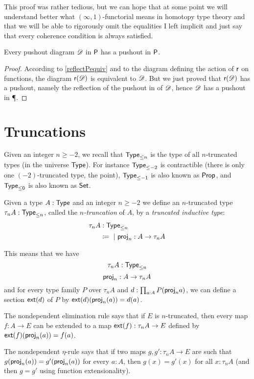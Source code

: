 This proof was rather tedious, but we can hope that at some point we will
understand better what $(\infty,1)$-functorial means in homotopy type theory and
that we will be able to rigorously omit the equalities I left implicit and just
say that every coherence condition is always satisfied.

\begin{cor}
  Every pushout diagram $\Ddiag$ in $\P$ has a pushout in $\P$.
\end{cor}

\begin{proof}
  According to \autoref{reflectPequiv} and to the diagram defining the action of
  $\reflect$ on functions, the diagram $\reflect(\Ddiag)$ is equivalent to
  $\Ddiag$. But we just proved that $\reflect(\Ddiag)$ has a pushout, namely the
  reflection of the pushout in \type of $\Ddiag$, hence $\Ddiag$ has a pushout
  in \P.
\end{proof}

\section{Truncations}

Given an integer $n\ge-2$, we recall that $\typele{n}$ is the type of all
$n$-truncated types (in the universe $\type$). For instance $\typele{-2}$ is
contractible (there is only one $(-2)$-truncated type, the point), $\typele{-1}$
is also known as $\prop$, and $\typele{0}$ is also known as $\set$.

Given a type $A:\type$ and an integer $n\ge-2$ we define an $n$-truncated type
$\tau_nA:\typele{n}$, called the \emph{$n$-truncation} of $A$, by a
\emph{truncated inductive type}:
\begin{align*}
  \tau_nA&:\typele{n}\\
  &\coloneqq\ |\ \tproj_n:A\to\tau_nA
\end{align*}

This means that we have
\[\tau_nA:\typele{n}\]
\[\tproj_n:A\to\tau_nA\]
and for every type family $P$ over $\tau_nA$ and $d:\prod_{a:A}P(\tproj_na)$,
we can define a section $\extend{d}$ of $P$ by $\extend{d}(\tproj_n(a))=d(a)$.

The nondependent elimination rule says that if $E$ is $n$-truncated, then every
map $f:A\to{}E$ can be extended to a map $\extend{f}:\tau_nA\to{}E$ defined by
$\extend{f}(\tproj_n(a))=f(a)$.

The nondependent $\eta$-rule says that if two maps $g,g':\tau_nA\to{}E$ are
such that $g(\tproj_n(a))=g'(\tproj_n(a))$ for every $a:A$, then $g(x)=g'(x)$
for all $x:\tau_nA$ (and then $g=g'$ using function extensionality).


